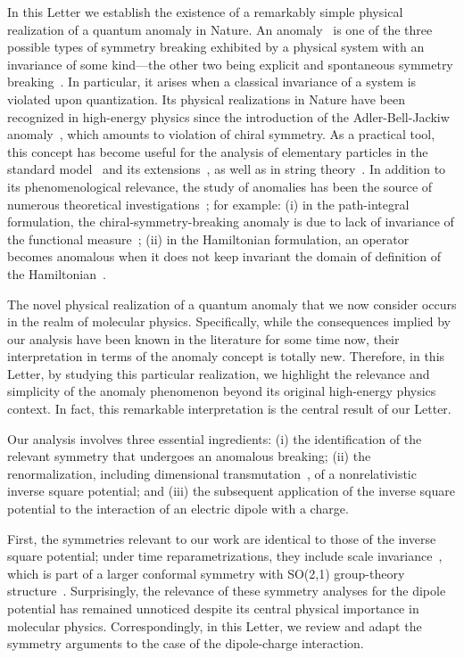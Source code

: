 \documentclass[a4paper,twocolumn,
showpacs,amssymb,aps,prl,superscriptaddress]{revtex4}%
\begin{document}
In this Letter we establish the existence of a remarkably simple
physical realization of a quantum anomaly in Nature. An
anomaly~\cite{tre:85,don:92} is one of the three possible types of
symmetry breaking exhibited by a physical system with an
invariance of some kind---the other two being explicit and
spontaneous symmetry breaking~\cite{hol:00}. In particular, it
arises when a classical invariance of a system is violated upon
quantization. Its physical realizations in Nature have been
recognized in high-energy physics since the introduction of the
Adler-Bell-Jackiw anomaly~\cite{a-b-j1,a-b-j2,a-b-j3}, which
amounts to violation of chiral symmetry. As a practical tool, this
concept has become useful for the analysis of elementary
particles in the standard model~\cite{don:92} and its
extensions~\cite{extensions}, as well as in string
theory~\cite{string}. In addition to its phenomenological
relevance, the study of anomalies has been the source of numerous
theoretical investigations~\cite{tre:85}; for example: (i) in the
path-integral formulation, the chiral-symmetry-breaking anomaly
is due to lack of invariance of the functional
measure~\cite{fuj:79}; (ii) in the Hamiltonian formulation, an
operator becomes anomalous when it does not keep invariant the
domain of definition of the Hamiltonian~\cite{est:86}.

The novel physical realization of a quantum anomaly
that we now consider occurs in the realm of molecular physics.
Specifically,
while the consequences implied by our analysis have been
known in the literature for some time now, their 
interpretation in terms of the anomaly concept is totally new.
Therefore, in this Letter,
by studying this particular realization,
we highlight the relevance and simplicity
of the anomaly phenomenon beyond its original high-energy physics context.
In fact, this remarkable interpretation is the central result of our Letter.

Our analysis involves three essential
ingredients: (i) the identification of the relevant symmetry that
undergoes an anomalous breaking; (ii) the renormalization, 
including dimensional
transmutation~\cite{col:73,cam:00b}, of a nonrelativistic inverse
square potential; and (iii) the subsequent application of the
inverse square potential to the interaction of an electric dipole
with a charge.

 First, the symmetries relevant to our work
are identical to those of the inverse square potential; under time
reparametrizations, they include scale invariance~\cite{jac:72},
which is part of a larger conformal symmetry with SO(2,1) group-theory 
structure~\cite{alf:76}. Surprisingly, the relevance of
these symmetry analyses for the dipole potential has remained
unnoticed despite its central physical importance in molecular
physics. Correspondingly, in this Letter, we review and adapt the
symmetry arguments to the case of the dipole-charge interaction.
\end{document}
